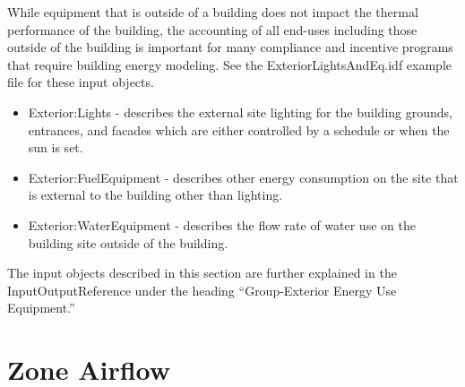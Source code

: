 While equipment that is outside of a building does not impact the
thermal performance of the building, the accounting of all end-uses
including those outside of the building is important for many compliance
and incentive programs that require building energy modeling. See
the ExteriorLightsAndEq.idf example file for these input objects.
\begin{itemize}
\item Exterior:Lights - describes the external site lighting for the building
grounds, entrances, and facades which are either controlled by a schedule
or when the sun is set.
\item Exterior:FuelEquipment - describes other energy consumption on the
site that is external to the building other than lighting.
\item Exterior:WaterEquipment - describes the flow rate of water use on
the building site outside of the building.
\end{itemize}
The input objects described in this section are further explained
in the InputOutputReference under the heading ``Group-Exterior Energy
Use Equipment.''

\section{Zone Airflow}

